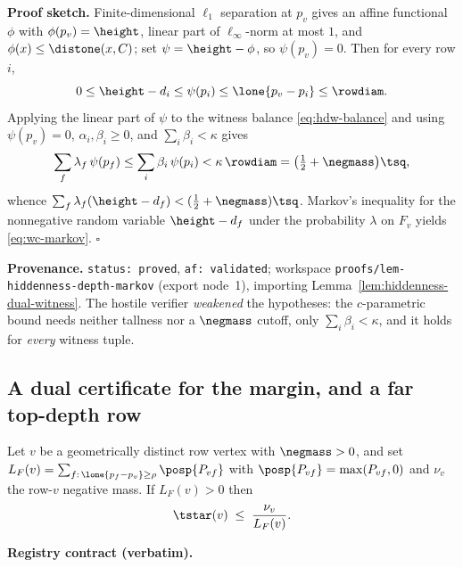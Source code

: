 \noindent\textbf{Proof sketch.} Finite-dimensional $\ell_1$ separation at $p_v$ gives an affine
functional $\phi$ with $\phi(p_v)=\height$, linear part of $\ell_\infty$-norm at most $1$, and
$\phi(x)\le\distone(x,C)$; set $\psi=\height-\phi$, so $\psi(p_v)=0$. Then for every row $i$,
\[
  0\le \height-d_i\le\psi(p_i)\le\lone{p_v-p_i}\le\rowdiam .
\]
Applying the linear part of $\psi$ to the witness balance \eqref{eq:hdw-balance} and using
$\psi(p_v)=0$, $\alpha_i,\beta_i\ge0$, and $\sum_i\beta_i<\kappa$ gives
\[
  \sum_{f}\lambda_f\,\psi(p_f)\le\sum_i\beta_i\,\psi(p_i)<\kappa\,\rowdiam=\bigl(\tfrac12+\negmass\bigr)\tsq ,
\]
whence $\sum_f\lambda_f(\height-d_f)<(\tfrac12+\negmass)\tsq$. Markov's inequality for the nonnegative
random variable $\height-d_f$ under the probability $\lambda$ on $F_v$ yields \eqref{eq:wc-markov}.
\hfill$\square$

\noindent\textbf{Provenance.} \texttt{status: proved}, \texttt{af: validated}; workspace
\texttt{proofs/lem-hiddenness-depth-markov} (export node~1), importing
Lemma~\ref{lem:hiddenness-dual-witness}. The hostile verifier \emph{weakened} the hypotheses: the
$c$-parametric bound needs neither tallness nor a $\negmass$ cutoff, only $\sum_i\beta_i<\kappa$, and it
holds for \emph{every} witness tuple.

\subsection{A dual certificate for the margin, and a far top-depth row}

\begin{lemma}\label{lem:row-far-dual-certificate}
Let $v$ be a geometrically distinct row vertex with $\negmass>0$, and set
$L_F(v)=\sum_{f:\,\lone{p_f-p_v}\ge\rho}\posp{P_{vf}}$ with $\posp{P_{vf}}=\max(P_{vf},0)$ and $\nu_v$
the row-$v$ negative mass. If $L_F(v)>0$ then
\begin{equation}\label{eq:wc-cert}
  \tstar(v)\;\le\;\frac{\nu_v}{L_F(v)} .
\end{equation}
\end{lemma}

\noindent\textbf{Registry contract (verbatim).}

